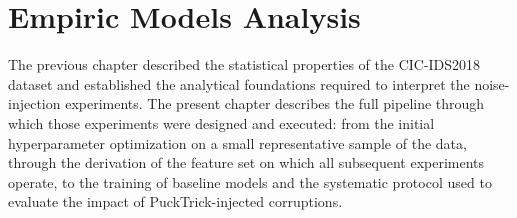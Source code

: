 \documentclass[../main.tex]{subfiles}
\begin{document}
\chapter{Empiric Models Analysis}
\label{chap:5-Empiric-analysis-models}

The previous chapter described the statistical properties of the CIC-IDS2018\supercite{cicids2018Official} dataset and established the analytical foundations required to interpret the noise-injection experiments. The present chapter describes the full pipeline through which those experiments were designed and executed: from the initial hyperparameter optimization on a small representative sample of the data, through the derivation of the feature set on which all subsequent experiments operate, to the training of baseline models and the systematic protocol used to evaluate the impact of PuckTrick-injected corruptions.
\end{document}
